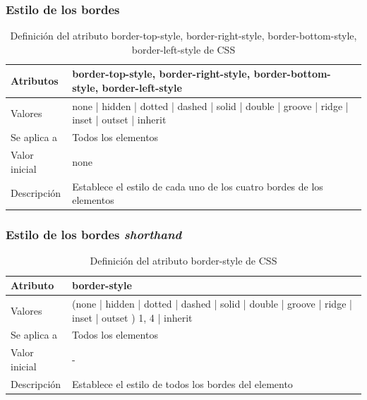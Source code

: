 \documentclass[ucs]{beamer}
\begin{document}

\begin{frame}
\frametitle{Estilo de los bordes}

\begin{center}
  \begin{table}
   \begin{tabular}{p{1.8cm}p{7.8cm}}
Atributos &\bf{border-top-style}, \bf{border-right-style}, \bf{border-bottom-style}, \bf{border-left-style} \\ \hline
Valores & none | hidden | dotted | dashed | solid | double | groove | ridge | inset | outset | inherit \\ \hline
Se aplica a & Todos los elementos \\ \hline
Valor inicial & none \\ \hline
Descripción & Establece el estilo de cada uno de los cuatro bordes de los elementos \\ \hline
  \end{tabular}
   \caption{Definición del atributo border-top-style, border-right-style, border-bottom-style, border-left-style de CSS}
 \end{table}
\end{center}

\end{frame}


\begin{frame}
\frametitle{Estilo de los bordes \emph{shorthand}}

\begin{center}
  \begin{table}
   \begin{tabular}{p{1.8cm}p{7.8cm}}
Atributo &\bf{border-style} \\ \hline
Valores & (none | hidden | dotted | dashed | solid | double | groove | ridge | inset | outset ) {1, 4} | inherit \\ \hline
Se aplica a & Todos los elementos \\ \hline
Valor inicial & - \\ \hline
Descripción & Establece el estilo de todos los bordes del elemento \\ \hline
  \end{tabular}
   \caption{Definición del atributo border-style de CSS}
 \end{table}
\end{center}

\end{frame}
\end{document}
